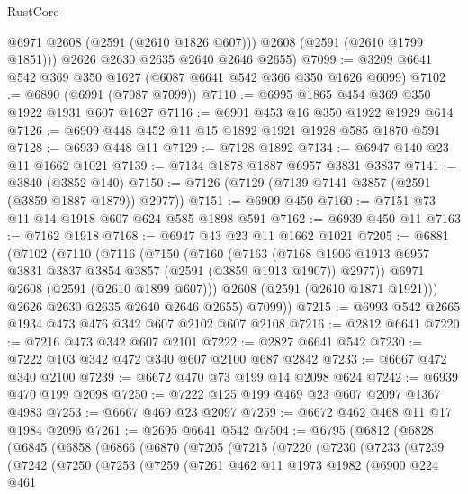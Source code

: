 \begin{lexlean}{RustCore}
\begin{coremodule}
          @6971
          @2608
          (@2591 (@2610 @1826 @607)))
        @2608
        (@2591 (@2610 @1799 @1851)))
      @2626
      @2630
      @2635
      @2640
      @2646
      @2655)
@7099 := @3209 @6641 @542 @369 @350 @1627 (@6087 @6641 @542 @366 @350 @1626 @6099)
@7102 := @6890 (@6991 (@7087 @7099))
@7110 := @6995 @1865 @454 @369 @350 @1922 @1931 @607 @1627
@7116 := @6901 @453 @16 @350 @1922 @1929 @614
@7126 := @6909 @448 @452 @11 @15 @1892 @1921 @1928 @585 @1870 @591
@7128 := @6939 @448 @11
@7129 := @7128 @1892
@7134 := @6947 @140 @23 @11 @1662 @1021
@7139 := @7134 @1878 @1887 @6957 @3831 @3837
@7141 := @3840 (@3852 @140)
@7150 := @7126 (@7129 (@7139 @7141 @3857 (@2591 (@3859 @1887 @1879)) @2977))
@7151 := @6909 @450
@7160 := @7151 @73 @11 @14 @1918 @607 @624 @585 @1898 @591
@7162 := @6939 @450 @11
@7163 := @7162 @1918
@7168 := @6947 @43 @23 @11 @1662 @1021
@7205 := @6881
    (@7102
      (@7110
        (@7116
          (@7150
            (@7160
              (@7163
                (@7168 @1906 @1913 @6957 @3831 @3837 @3854 @3857 (@2591 (@3859 @1913 @1907)) @2977))
              @6971
              @2608
              (@2591 (@2610 @1899 @607)))
            @2608
            (@2591 (@2610 @1871 @1921)))
          @2626
          @2630
          @2635
          @2640
          @2646
          @2655)
        @7099))
@7215 := @6993 @542 @2665 @1934 @473 @476 @342 @607 @2102 @607 @2108
@7216 := @2812 @6641
@7220 := @7216 @473 @342 @607 @2101
@7222 := @2827 @6641 @542
@7230 := @7222 @103 @342 @472 @340 @607 @2100 @687 @2842
@7233 := @6667 @472 @340 @2100
@7239 := @6672 @470 @73 @199 @14 @2098 @624
@7242 := @6939 @470 @199 @2098
@7250 := @7222 @125 @199 @469 @23 @607 @2097 @1367 @4983
@7253 := @6667 @469 @23 @2097
@7259 := @6672 @462 @468 @11 @17 @1984 @2096
@7261 := @2695 @6641 @542
@7504 := @6795
    (@6812
      (@6828
        (@6845
          (@6858
            (@6866
              (@6870
                (@7205
                  (@7215
                    (@7220
                      (@7230
                        (@7233
                          (@7239
                            (@7242
                              (@7250
                                (@7253
                                  (@7259
                                    (@7261
                                      @462
                                      @11
                                      @1973
                                      @1982
                                      (@6900
                                        @224
                                        @461

\end{coremodule}
\end{lexlean}

